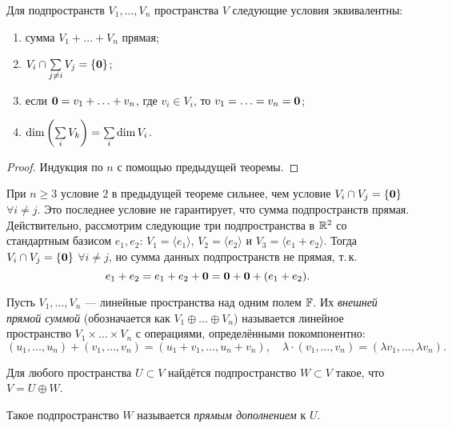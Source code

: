 \begin{theorem}
    Для подпространств $V_1, \ldots, V_n$ пространства $V$ следующие условия эквивалентны:
    \begin{enumerate}[nolistsep]
        \item сумма $V_1 + \ldots + V_n$ прямая;
        \item $V_i \cap \sum\limits_{j \ne i}V_j = \{\boldsymbol{0}\}$;
        \item если $\boldsymbol{0} = v_1 + \ldots + v_n$, где $v_i \in V_i$, то $v_1 = \ldots = v_n = \boldsymbol{0}$;
        \item $\dim\left(\sum\limits_iV_k\right) = \sum\limits_i\dim V_i$.
    \end{enumerate}
\end{theorem}

\begin{proof}
    Индукция по $n$ с помощью предыдущей теоремы.
\end{proof}

\begin{remark}
    При $n \geqslant 3$ условие $2$ в предыдущей теореме сильнее, чем условие $V_i \cap V_j = \{\boldsymbol{0}\}$ $\forall i \ne j$. Это последнее условие не гарантирует, что сумма подпространств прямая. Действительно, рассмотрим следующие три подпространства в $\mathbb{R}^2$ со стандартным базисом $e_1, e_2$: $V_1 = \langle e_1\rangle$, $V_2 = \langle e_2\rangle$ и $V_3 = \langle e_1 + e_2\rangle$. Тогда $V_i \cap V_j = \{\boldsymbol{0}\}$ $\forall i \ne j$, но сумма данных подпространств не прямая, т.\,к. \[e_1 + e_2 = e_1 + e_2 + \boldsymbol{0} = \boldsymbol{0} + \boldsymbol{0} + (e_1 + e_2).\]
\end{remark}

\begin{definition}
    Пусть $V_1, \ldots, V_n$ --- линейные пространства над одним полем $\mathbb{F}$. Их \textit{внешней прямой суммой} (обозначается как $V_1 \oplus \ldots \oplus V_n$) называется линейное пространство $V_1 \times \ldots \times V_n$ с операциями, определёнными покомпонентно:
    \[
        (u_1, \ldots, u_n) + (v_1, \ldots, v_n) = (u_1 + v_1, \ldots, u_n + v_n),\quad \lambda \cdot (v_1, \ldots, v_n) = (\lambda v_1, \ldots, \lambda v_n).
    \]
\end{definition}

\begin{proposal}
    Для любого пространства $U \subset V$ найдётся подпространство $W \subset V$ такое, что $V = U \oplus W$.
\end{proposal}

\begin{definition}
    Такое подпространство $W$ называется \textit{прямым дополнением} к $U$.
\end{definition}

